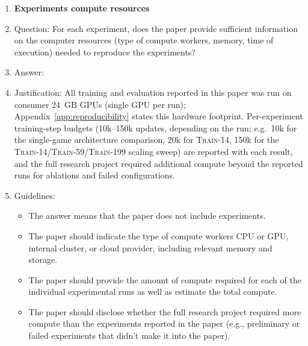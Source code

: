 \begin{enumerate}
\item {\bf Experiments compute resources}
    \item[] Question: For each experiment, does the paper provide sufficient information on the computer resources (type of compute workers, memory, time of execution) needed to reproduce the experiments?
    \item[] Answer: \answerYes{}
    \item[] Justification: All training and evaluation reported in this paper was run on consumer 24~GB GPUs (single GPU per run); Appendix~\ref{app:reproducibility} states this hardware footprint. Per-experiment training-step budgets (10k--150k updates, depending on the run; e.g.\ 10k for the single-game architecture comparison, 20k for \textsc{Train-14}, 150k for the \textsc{Train-14}/\textsc{Train-59}/\textsc{Train-199} scaling sweep) are reported with each result, and the full research project required additional compute beyond the reported runs for ablations and failed configurations.
    \item[] Guidelines:
    \begin{itemize}
        \item The answer \answerNA{} means that the paper does not include experiments.
        \item The paper should indicate the type of compute workers CPU or GPU, internal cluster, or cloud provider, including relevant memory and storage.
        \item The paper should provide the amount of compute required for each of the individual experimental runs as well as estimate the total compute.
        \item The paper should disclose whether the full research project required more compute than the experiments reported in the paper (e.g., preliminary or failed experiments that didn't make it into the paper).
    \end{itemize}


\end{enumerate}
